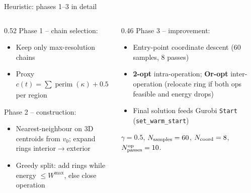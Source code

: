 \documentclass[aspectratio=169,10pt]{beamer}
\begin{document}
\begin{frame}{Heuristic: phases 1--3 in detail}
  \begin{columns}[T,onlytextwidth]
    \begin{column}{0.52\textwidth}
      {\small Phase 1 -- chain selection:}
      \begin{itemize}
        \item Keep only max-resolution chains
        \item Proxy $c(t)=\sum \operatorname{perim}(\kappa)+0.5\,(d_{xy}+h_t)$ per region
      \end{itemize}
      {\small Phase 2 -- construction:}
      \begin{itemize}
        \item Nearest-neighbour on 3D centroids from $v_0$; expand rings interior$\to$exterior
        \item Greedy split: add rings while energy $\le W^{\max}$, else close operation
      \end{itemize}
    \end{column}
    \begin{column}{0.46\textwidth}
      {\small Phase 3 -- improvement:}
      \begin{itemize}
        \item Entry-point coordinate descent (60 samples, 8 passes)
        \item \textbf{2-opt} intra-operation; \textbf{Or-opt} inter-operation (relocate ring if both ops feasible and energy drops)
        \item Final solution feeds Gurobi \texttt{Start} (\texttt{set\_warm\_start})
      \end{itemize}
      \vspace{0.08cm}
      {\scriptsize $\gamma=0.5$, $N_{\rm samples}=60$, $N_{\rm coord}=8$, $N_{\rm passes}^{\rm op}=10$.}
    \end{column}
  \end{columns}
\end{frame}

\end{document}
